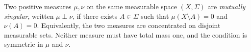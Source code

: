 
Two positive measures $\mu,\nu$ on the same measurable space $(X,\Sigma)$ are \emph{mutually singular}, written $\mu\perp\nu$, if there exists $A\in\Sigma$ such that $\mu(X\setminus A)=0$ and $\nu(A)=0$. Equivalently, the two measures are concentrated on disjoint measurable sets. Neither measure must have total mass one, and the condition is symmetric in $\mu$ and $\nu$.
